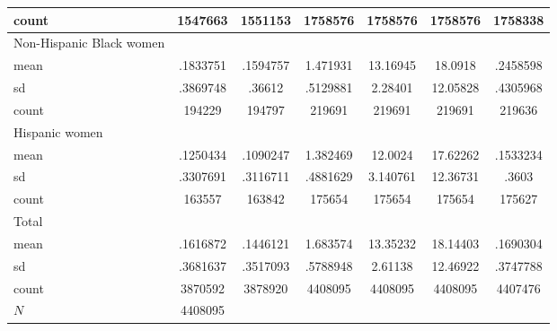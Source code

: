 {\begin{longtable}{l*{1}{cccccc}}
count       &     1547663&     1551153&     1758576&     1758576&     1758576&     1758338\\
\hline
Non-Hispanic Black women&            &            &            &            &            &            \\
mean        &    .1833751&    .1594757&    1.471931&    13.16945&     18.0918&    .2458598\\
sd          &    .3869748&      .36612&    .5129881&     2.28401&    12.05828&    .4305968\\
count       &      194229&      194797&      219691&      219691&      219691&      219636\\
\hline
Hispanic women&            &            &            &            &            &            \\
mean        &    .1250434&    .1090247&    1.382469&     12.0024&    17.62262&    .1533234\\
sd          &    .3307691&    .3116711&    .4881629&    3.140761&    12.36731&       .3603\\
count       &      163557&      163842&      175654&      175654&      175654&      175627\\
\hline
Total       &            &            &            &            &            &            \\
mean        &    .1616872&    .1446121&    1.683574&    13.35232&    18.14403&    .1690304\\
sd          &    .3681637&    .3517093&    .5788948&     2.61138&    12.46922&    .3747788\\
count       &     3870592&     3878920&     4408095&     4408095&     4408095&     4407476\\
\hline
\(N\)       &     4408095&            &            &            &            &            \\
\hline\hline
\end{longtable}
}
